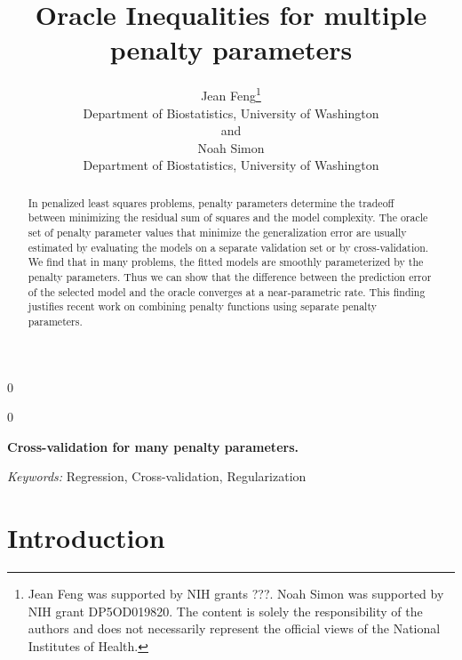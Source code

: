 \documentclass[12pt]{article}
\newcommand{\blind}{0}
\begin{document}
\def\spacingset#1{\renewcommand{\baselinestretch}%
{#1}\small\normalsize} \spacingset{1}



\blind
{
  \title{\bf Oracle Inequalities for multiple penalty parameters}
  \author{Jean Feng\thanks{
    Jean Feng was supported by NIH grants ???. %
    Noah Simon was supported by NIH grant DP5OD019820.
    The content is solely the responsibility of the authors and does not necessarily represent the official views of the National Institutes of Health.}\\
    Department of Biostatistics, University of Washington\\
    and \\
    Noah Simon \\
    Department of Biostatistics, University of Washington}
  \maketitle
} \fi

\blind
{
  \bigskip
  \bigskip
  \bigskip
  \begin{center}
    {\LARGE\bf Cross-validation for many penalty parameters.}
\end{center}
  \medskip
} \fi

\bigskip
\begin{abstract}

In penalized least squares problems, penalty parameters determine the tradeoff between minimizing the residual sum of squares and the model complexity. The oracle set of penalty parameter values that minimize the generalization error are usually estimated by evaluating the models on a separate validation set or by cross-validation. We find that in many problems, the fitted models are smoothly parameterized by the penalty parameters. Thus we can show that the difference between the prediction error of the selected model and the oracle converges at a near-parametric rate. This finding justifies recent work on combining penalty functions using separate penalty parameters.

\end{abstract}

\noindent%
{\it Keywords:}  Regression, Cross-validation, Regularization
\vfill

\newpage
\spacingset{1.45}
\section{Introduction}
\end{document}
